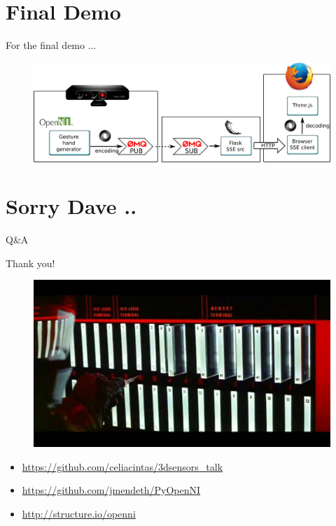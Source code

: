 \documentclass[bigger]{beamer}
\begin{document}

\section{Final Demo}
\begin{frame}{ For the final demo ...}
\begin{figure}[h]
        \includegraphics[scale = 0.35]{Imagenes/final_pochi.png}
\end{figure}
\end{frame}


\section{Sorry Dave ..}

\begin{frame}{ Q\&A}
\begin{center}
\begin{huge}
Thank you!
\end{huge}
\end{center}
\begin{figure}[h]
		\includegraphics[scale = 0.15]{Imagenes/final.jpg}
\end{figure}
\begin{Small}
\begin{itemize}
    \item \url{https://github.com/celiacintas/3dsensors_talk}
    \item \url{https://github.com/jmendeth/PyOpenNI}
    \item \url{http://structure.io/openni}
\end{itemize}
\end{Small}
\end{frame}
\end{document}
